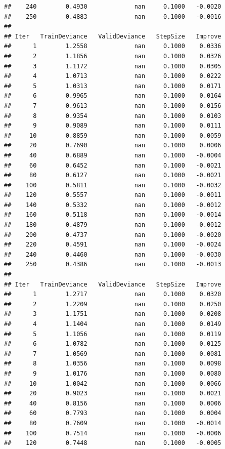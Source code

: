 \documentclass[]{book}
\begin{document}
\begin{verbatim}
##    240        0.4930             nan     0.1000   -0.0020
##    250        0.4883             nan     0.1000   -0.0016
## 
## Iter   TrainDeviance   ValidDeviance   StepSize   Improve
##      1        1.2558             nan     0.1000    0.0336
##      2        1.1856             nan     0.1000    0.0326
##      3        1.1172             nan     0.1000    0.0305
##      4        1.0713             nan     0.1000    0.0222
##      5        1.0313             nan     0.1000    0.0171
##      6        0.9965             nan     0.1000    0.0164
##      7        0.9613             nan     0.1000    0.0156
##      8        0.9354             nan     0.1000    0.0103
##      9        0.9089             nan     0.1000    0.0111
##     10        0.8859             nan     0.1000    0.0059
##     20        0.7690             nan     0.1000    0.0006
##     40        0.6889             nan     0.1000   -0.0004
##     60        0.6452             nan     0.1000   -0.0021
##     80        0.6127             nan     0.1000   -0.0021
##    100        0.5811             nan     0.1000   -0.0032
##    120        0.5557             nan     0.1000   -0.0011
##    140        0.5332             nan     0.1000   -0.0012
##    160        0.5118             nan     0.1000   -0.0014
##    180        0.4879             nan     0.1000   -0.0012
##    200        0.4737             nan     0.1000   -0.0020
##    220        0.4591             nan     0.1000   -0.0024
##    240        0.4460             nan     0.1000   -0.0030
##    250        0.4386             nan     0.1000   -0.0013
## 
## Iter   TrainDeviance   ValidDeviance   StepSize   Improve
##      1        1.2717             nan     0.1000    0.0320
##      2        1.2209             nan     0.1000    0.0250
##      3        1.1751             nan     0.1000    0.0208
##      4        1.1404             nan     0.1000    0.0149
##      5        1.1056             nan     0.1000    0.0119
##      6        1.0782             nan     0.1000    0.0125
##      7        1.0569             nan     0.1000    0.0081
##      8        1.0356             nan     0.1000    0.0098
##      9        1.0176             nan     0.1000    0.0080
##     10        1.0042             nan     0.1000    0.0066
##     20        0.9023             nan     0.1000    0.0021
##     40        0.8156             nan     0.1000    0.0006
##     60        0.7793             nan     0.1000    0.0004
##     80        0.7609             nan     0.1000   -0.0014
##    100        0.7514             nan     0.1000   -0.0006
##    120        0.7448             nan     0.1000   -0.0005

\end{verbatim}
\end{document}
